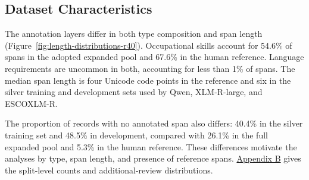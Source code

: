 \subsection{Dataset Characteristics}
\label{sec:dataset-characteristics}


The annotation layers differ in both type composition and span length (Figure~\ref{fig:length-distributions-r40}). Occupational skills account for 54.6\% of spans in the adopted expanded pool and 67.6\% in the human reference. Language requirements are uncommon in both, accounting for less than 1\% of spans. The median span length is four Unicode code points in the reference and six in the silver training and development sets used by Qwen, XLM-R-large, and ESCOXLM-R.

The proportion of records with no annotated span also differs: 40.4\% in the silver training set and 48.5\% in development, compared with 26.1\% in the full expanded pool and 5.3\% in the human reference. These differences motivate the analyses by type, span length, and presence of reference spans. \hyperref[app:b]{Appendix B} gives the split-level counts and additional-review distributions.
